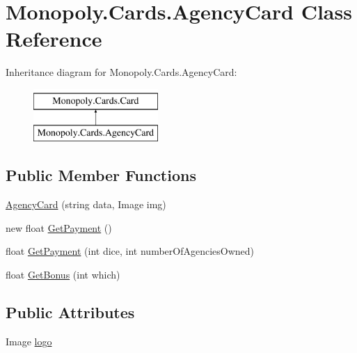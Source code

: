 \hypertarget{class_monopoly_1_1_cards_1_1_agency_card}{}\section{Monopoly.\+Cards.\+Agency\+Card Class Reference}
\label{class_monopoly_1_1_cards_1_1_agency_card}
Inheritance diagram for Monopoly.\+Cards.\+Agency\+Card\+:\begin{figure}[H]
\begin{center}
\leavevmode
\includegraphics[height=2.000000cm]{class_monopoly_1_1_cards_1_1_agency_card}
\end{center}
\end{figure}
\subsection*{Public Member Functions}
\begin{DoxyCompactItemize}
\item 
\mbox{\hyperlink{class_monopoly_1_1_cards_1_1_agency_card_ac328333ee5f6dc5b7e0903af22aff615}{Agency\+Card}} (string data, Image img)
\item 
new float \mbox{\hyperlink{class_monopoly_1_1_cards_1_1_agency_card_a7463b9f93db864ea03b2e0d6b2973e41}{Get\+Payment}} ()
\item 
float \mbox{\hyperlink{class_monopoly_1_1_cards_1_1_agency_card_a53d78c8afb2c5043dbb016d46e8102ce}{Get\+Payment}} (int dice, int number\+Of\+Agencies\+Owned)
\item 
float \mbox{\hyperlink{class_monopoly_1_1_cards_1_1_agency_card_af4892a0f8424badd42a01306e705e619}{Get\+Bonus}} (int which)
\end{DoxyCompactItemize}
\subsection*{Public Attributes}
\begin{DoxyCompactItemize}
\item 
Image \mbox{\hyperlink{class_monopoly_1_1_cards_1_1_card_a84da6fc446a55518f9bdf8fa7eef9057}{logo}}
\end{DoxyCompactItemize}
